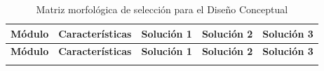 \begin{longtable}{@{}|p{2cm}|p{2.5cm}|p{2.5cm}|p{2.5cm}|p{2.5cm}|}
	\caption{Matriz morfológica de selección para el Diseño Conceptual}
	\hline
	\textbf{Módulo} & \textbf{Características} & \textbf{Solución 1} & \textbf{Solución 2} & \textbf{Solución 3} \\
	\hline \hline
	\endfirsthead
	
	\hline
	\textbf{Módulo} & \textbf{Características} & \textbf{Solución 1} & \textbf{Solución 2} & \textbf{Solución 3} \\
	\hline \hline
	\endhead
	
	\multicolumn{5}{c}{}
	\endfoot
	
	\endlastfoot
	

\end{longtable}
